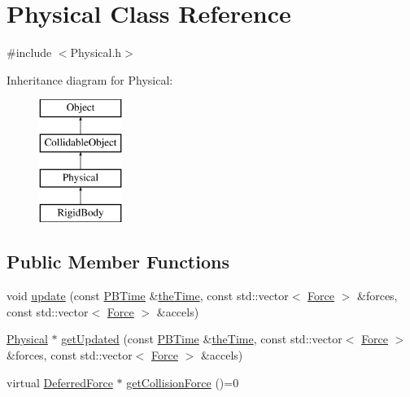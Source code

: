 \hypertarget{class_physical}{\section{Physical Class Reference}
\label{class_physical}
}


{\ttfamily \#include $<$Physical.\-h$>$}

Inheritance diagram for Physical\-:\begin{figure}[H]
\begin{center}
\leavevmode
\includegraphics[height=4.000000cm]{class_physical}
\end{center}
\end{figure}
\subsection*{Public Member Functions}
\begin{DoxyCompactItemize}
\item 
void \hyperlink{class_physical_a61419e993f622482a2c2ae4614a16944}{update} (const \hyperlink{class_p_b_time}{P\-B\-Time} \&\hyperlink{_physically_based_8h_a766da334af281a8fa1ed5cf404d0ec45}{the\-Time}, const std\-::vector$<$ \hyperlink{class_force}{Force} $>$ \&forces, const std\-::vector$<$ \hyperlink{class_force}{Force} $>$ \&accels)
\item 
\hyperlink{class_physical}{Physical} $\ast$ \hyperlink{class_physical_a3ba7964e2b399a96b5c306328ff9367d}{get\-Updated} (const \hyperlink{class_p_b_time}{P\-B\-Time} \&\hyperlink{_physically_based_8h_a766da334af281a8fa1ed5cf404d0ec45}{the\-Time}, const std\-::vector$<$ \hyperlink{class_force}{Force} $>$ \&forces, const std\-::vector$<$ \hyperlink{class_force}{Force} $>$ \&accels)
\item 
virtual \hyperlink{class_deferred_force}{Deferred\-Force} $\ast$ \hyperlink{class_physical_aaa95a85d67ec076d41a301e546661452}{get\-Collision\-Force} ()=0
\end{DoxyCompactItemize}
